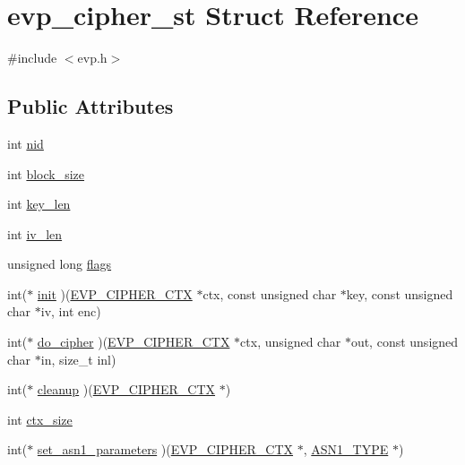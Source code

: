 \hypertarget{structevp__cipher__st}{}\section{evp\+\_\+cipher\+\_\+st Struct Reference}
\label{structevp__cipher__st}


{\ttfamily \#include $<$evp.\+h$>$}

\subsection*{Public Attributes}
\begin{DoxyCompactItemize}
\item 
int \hyperlink{structevp__cipher__st_a3e92a36ebcc6d193fa91f0edf7aa5561}{nid}
\item 
int \hyperlink{structevp__cipher__st_a63036565998126ddd20ba6b1b901df28}{block\+\_\+size}
\item 
int \hyperlink{structevp__cipher__st_a6f3df99c0808facaf1a5bb730cbd0b22}{key\+\_\+len}
\item 
int \hyperlink{structevp__cipher__st_add3e3ebb7252cd8326a98d309877a134}{iv\+\_\+len}
\item 
unsigned long \hyperlink{structevp__cipher__st_a84a16719073d93e98517a6b38c47ba3f}{flags}
\item 
int($\ast$ \hyperlink{structevp__cipher__st_a1459fa00f4ae13d2f6ede957ec33165c}{init} )(\hyperlink{ossl__typ_8h_aab2bd6a044e1d31ebc2fe82b3b0b3d9a}{E\+V\+P\+\_\+\+C\+I\+P\+H\+E\+R\+\_\+\+C\+TX} $\ast$ctx, const unsigned char $\ast$key, const unsigned char $\ast$iv, int enc)
\item 
int($\ast$ \hyperlink{structevp__cipher__st_aa61fb3ac50f7917d1c00475f537d8328}{do\+\_\+cipher} )(\hyperlink{ossl__typ_8h_aab2bd6a044e1d31ebc2fe82b3b0b3d9a}{E\+V\+P\+\_\+\+C\+I\+P\+H\+E\+R\+\_\+\+C\+TX} $\ast$ctx, unsigned char $\ast$out, const unsigned char $\ast$in, size\+\_\+t inl)
\item 
int($\ast$ \hyperlink{structevp__cipher__st_ab5d28076841224e07599d579fb7c0d28}{cleanup} )(\hyperlink{ossl__typ_8h_aab2bd6a044e1d31ebc2fe82b3b0b3d9a}{E\+V\+P\+\_\+\+C\+I\+P\+H\+E\+R\+\_\+\+C\+TX} $\ast$)
\item 
int \hyperlink{structevp__cipher__st_a856751b3bf79b35b6178f574dea3d1bc}{ctx\+\_\+size}
\item 
int($\ast$ \hyperlink{structevp__cipher__st_aca59cfca681fefba705b0c58f9956e9b}{set\+\_\+asn1\+\_\+parameters} )(\hyperlink{ossl__typ_8h_aab2bd6a044e1d31ebc2fe82b3b0b3d9a}{E\+V\+P\+\_\+\+C\+I\+P\+H\+E\+R\+\_\+\+C\+TX} $\ast$, \hyperlink{asn1_8h_a7895e03d9fee2bc4963faf2a31a9439e}{A\+S\+N1\+\_\+\+T\+Y\+PE} $\ast$)

\end{DoxyCompactItemize}
